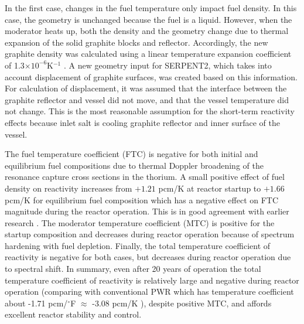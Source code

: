 In the first case, changes in the fuel temperature only impact fuel density. In 
this case, the geometry is unchanged because the fuel is a liquid. However, 
when the moderator heats up, both the density and the geometry change due to 
thermal expansion of the solid graphite blocks and reflector. Accordingly, the 
new graphite density was calculated using a linear temperature expansion 
coefficient of 1.3$\times10^{-6}$K$^{-1}$ \cite{robertson_conceptual_1971}. A 
new geometry input for SERPENT2, which takes into account displacement of 
graphite surfaces, was created based on this information. For calculation of 
displacement, it was assumed that the interface between the graphite reflector 
and vessel did not move, and that the vessel temperature did not change. This 
is the most reasonable assumption for the short-term reactivity effects because 
inlet salt is cooling graphite reflector and inner surface of the vessel.

The fuel temperature coefficient (FTC) is negative for both initial and 
equilibrium fuel compositions due to thermal Doppler broadening of the 
resonance capture cross sections in the thorium. A small positive effect of 
fuel density on reactivity increases from $+1.21$ pcm/K at reactor startup to 
$+1.66$ pcm/K for equilibrium fuel composition which has a negative effect on 
FTC magnitude during the reactor operation. This is in good agreement with 
earlier research \cite{robertson_conceptual_1971,park_whole_2015}. The 
moderator temperature coefficient (MTC) is positive for the startup composition 
and decreases during reactor operation because of spectrum hardening with fuel 
depletion. Finally, the total temperature coefficient of reactivity is negative 
for both cases, but decreases during reactor operation due to spectral shift. 
In summary, even after 20 years of operation the total temperature coefficient 
of reactivity is relatively large and negative during reactor operation 
(comparing with conventional PWR which has temperature coefficient about -1.71 
pcm/$^\circ$F $\approx$ -3.08 pcm/K \cite{forget_integral_2018}), despite 
positive MTC, and affords excellent reactor stability and control.

